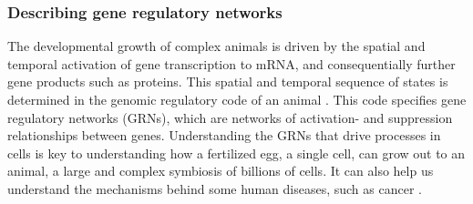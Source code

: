 \documentclass[../main.tex]{subfiles}
\begin{document}
\subsubsection{Describing gene regulatory networks}

The developmental growth of complex animals is driven by the spatial and temporal activation of gene transcription to mRNA, and consequentially further gene products such as proteins.
This spatial and temporal sequence of states is determined in the genomic regulatory code of an animal \cite{bolouri2002modeling, kuhn2009monte}.
This code specifies gene regulatory networks (GRNs), which are networks of activation- and suppression relationships between genes.
Understanding the GRNs that drive processes in cells is key to understanding how a fertilized egg, a single cell, can grow out to an animal, a large and complex symbiosis of billions of cells.
It can also help us understand the mechanisms behind some human diseases, such as cancer \cite{qian2008inference}.
\end{document}
